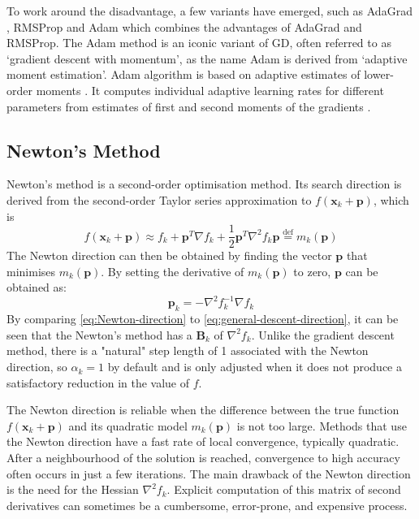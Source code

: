 To work around the disadvantage, a few variants have emerged, such as AdaGrad \cite{Duchi2011}, RMSProp \cite{Tieleman2012} and Adam \cite{Kingma2015} which combines the advantages of AdaGrad and RMSProp. The Adam method is an iconic variant of GD, often referred to as `gradient descent with momentum', as the name Adam is derived from `adaptive moment estimation'. Adam algorithm is based on adaptive estimates of lower-order moments \cite{Kingma2015}. It computes individual adaptive learning rates for different parameters from estimates of first and second moments of the gradients \cite{Kingma2015}.


\subsection{Newton's Method}
Newton's method is a second-order optimisation method. Its search direction is derived from the second-order Taylor series approximation to $f(\textbf{x}_k+\textbf{p})$, which is
\begin{equation}
  f(\textbf{x}_k+\textbf{p}) \approx f_k + \textbf{p}^T \nabla f_k + \frac{1}{2}\textbf{p}^T \nabla^2 f_k \textbf{p} \stackrel{\text{def}}{=}m_k(\textbf{p})
\end{equation}
The Newton direction can then be obtained by finding the vector $\textbf{p}$ that minimises $m_k(\textbf{p})$. By setting the derivative of $m_k(\textbf{p})$ to zero, $\textbf{p}$ can be obtained as:
\begin{equation}
  \textbf{p}_k=-\nabla^2 f_k^{-1}\nabla f_k \label{eq:Newton-direction}
\end{equation}
By comparing \cref{eq:Newton-direction} to \cref{eq:general-descent-direction}, it can be seen that the Newton's method has a $\textbf{B}_k$ of $\nabla^2 f_k$. Unlike the gradient descent method, there is a "natural" step length of 1 associated with the Newton direction, so $\alpha_k = 1$ by default and is only adjusted when it does not produce a satisfactory reduction in the value of $f$.

The Newton direction is reliable when the difference between the true function $f(\textbf{x}_k+\textbf{p})$ and its quadratic model $m_k(\textbf{p})$ is not too large. Methods that use the Newton direction have a fast rate of local convergence, typically quadratic. After a neighbourhood of the solution is reached, convergence to high accuracy often occurs in just a few iterations. The main drawback of the Newton direction is the need for the Hessian $\nabla^2 f_k$. Explicit computation of this matrix of second derivatives can sometimes be a cumbersome, error-prone, and expensive process. \cite{Nocedal2006}


